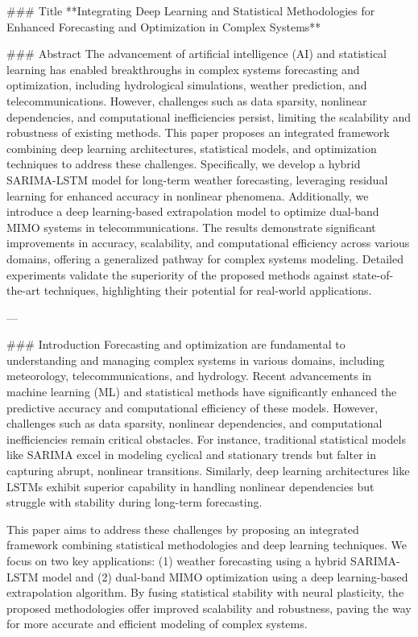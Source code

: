### Title
**Integrating Deep Learning and Statistical Methodologies for Enhanced Forecasting and Optimization in Complex Systems**

### Abstract
The advancement of artificial intelligence (AI) and statistical learning has enabled breakthroughs in complex systems forecasting and optimization, including hydrological simulations, weather prediction, and telecommunications. However, challenges such as data sparsity, nonlinear dependencies, and computational inefficiencies persist, limiting the scalability and robustness of existing methods. This paper proposes an integrated framework combining deep learning architectures, statistical models, and optimization techniques to address these challenges. Specifically, we develop a hybrid SARIMA-LSTM model for long-term weather forecasting, leveraging residual learning for enhanced accuracy in nonlinear phenomena. Additionally, we introduce a deep learning-based extrapolation model to optimize dual-band MIMO systems in telecommunications. The results demonstrate significant improvements in accuracy, scalability, and computational efficiency across various domains, offering a generalized pathway for complex systems modeling. Detailed experiments validate the superiority of the proposed methods against state-of-the-art techniques, highlighting their potential for real-world applications.

---

### Introduction
Forecasting and optimization are fundamental to understanding and managing complex systems in various domains, including meteorology, telecommunications, and hydrology. Recent advancements in machine learning (ML) and statistical methods have significantly enhanced the predictive accuracy and computational efficiency of these models. However, challenges such as data sparsity, nonlinear dependencies, and computational inefficiencies remain critical obstacles. For instance, traditional statistical models like SARIMA excel in modeling cyclical and stationary trends but falter in capturing abrupt, nonlinear transitions. Similarly, deep learning architectures like LSTMs exhibit superior capability in handling nonlinear dependencies but struggle with stability during long-term forecasting.

This paper aims to address these challenges by proposing an integrated framework combining statistical methodologies and deep learning techniques. We focus on two key applications: (1) weather forecasting using a hybrid SARIMA-LSTM model and (2) dual-band MIMO optimization using a deep learning-based extrapolation algorithm. By fusing statistical stability with neural plasticity, the proposed methodologies offer improved scalability and robustness, paving the way for more accurate and efficient modeling of complex systems.

